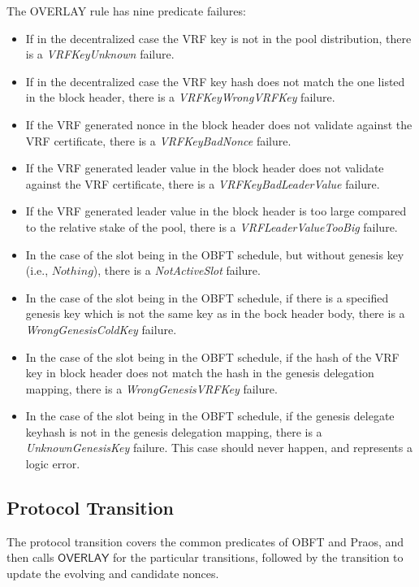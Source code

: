 The OVERLAY rule has nine predicate failures:
\begin{itemize}
\item If in the decentralized case the VRF key is not in the pool distribution,
  there is a \emph{VRFKeyUnknown} failure.
\item If in the decentralized case the VRF key hash does not match the one
  listed in the block header, there is a \emph{VRFKeyWrongVRFKey} failure.
\item If the VRF generated nonce in the block header does not validate
  against the VRF certificate, there is a \emph{VRFKeyBadNonce} failure.
\item If the VRF generated leader value in the block header does not validate
  against the VRF certificate, there is a \emph{VRFKeyBadLeaderValue} failure.
\item If the VRF generated leader value in the block header is too large
  compared to the relative stake of the pool, there is a \emph{VRFLeaderValueTooBig} failure.
\item In the case of the slot being in the OBFT schedule, but without genesis
  key (i.e., $Nothing$), there is a \emph{NotActiveSlot} failure.
\item In the case of the slot being in the OBFT schedule, if there is a
  specified genesis key which is not the same key as in the bock header body,
  there is a \emph{WrongGenesisColdKey} failure.
\item In the case of the slot being in the OBFT schedule, if the hash of the
  VRF key in block header does not match the hash in the genesis delegation mapping,
  there is a \emph{WrongGenesisVRFKey} failure.
\item In the case of the slot being in the OBFT schedule, if the genesis delegate
  keyhash is not in the genesis delegation mapping,
  there is a \emph{UnknownGenesisKey} failure.
  This case should never happen, and represents a logic error.

\end{itemize}

\clearpage

\subsection{Protocol Transition}
\label{sec:protocol-trans}

The protocol transition covers the common predicates of OBFT and Praos,
and then calls $\mathsf{OVERLAY}$ for the particular transitions,
followed by the transition to update the evolving and candidate nonces.

